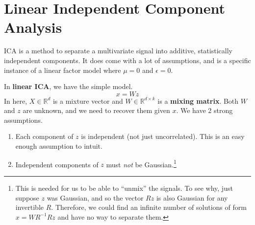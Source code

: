 \section{Linear Independent Component Analysis} 

  ICA is a method to separate a multivariate signal into additive, statistically independent components. It does come with a lot of assumptions, and is a specific instance of a linear factor model where $\mu = 0$ and $\epsilon = 0$. 

  \begin{definition}
    In \textbf{linear ICA}, we have the simple model. 
    \begin{equation}
      x = W z
    \end{equation}
    In here, $X \in \mathbb{R}^d$ is a mixture vector and $W \in \mathbb{R}^{d \times k}$ is a \textbf{mixing matrix}. Both $W$ and $z$ are unknown, and we need to recover them given $x$. We have 2 strong assumptions. 
    \begin{enumerate} 
      \item Each component of $z$ is independent (not just uncorrelated). This is an easy enough assumption to intuit.  
      \item Independent components of $z$ must \textit{not} be Gaussian.\footnote{This is needed for us to be able to ``unmix'' the signals. To see why, just suppose $z$ was Gaussian, and so the vector $Rz$ is also Gaussian for any invertible $R$. Therefore, we could find an infinite number of solutions of form $x = W R^{-1} R z$ and have no way to separate them.}
    \end{enumerate}
  \end{definition}

